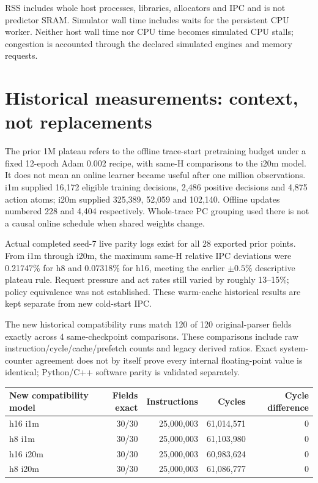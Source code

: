 \documentclass[10pt]{article}
\begin{document}
RSS includes whole host processes, libraries, allocators and IPC and is not predictor SRAM. Simulator wall time includes waits for the persistent CPU worker. Neither host wall time nor CPU time becomes simulated CPU stalls; congestion is accounted through the declared simulated engines and memory requests.

\clearpage\section{Historical measurements: context, not replacements}

The prior 1M plateau refers to the offline trace-start pretraining budget under a fixed 12-epoch Adam 0.002 recipe, with same-H comparisons to the i20m model. It does not mean an online learner became useful after one million observations. i1m supplied 16,172 eligible training decisions, 2,486 positive decisions and 4,875 action atoms; i20m supplied 325,389, 52,059 and 102,140. Offline updates numbered 228 and 4,404 respectively. Whole-trace PC grouping used there is not a causal online schedule when shared weights change.

Actual completed seed-7 live parity logs exist for all 28 exported prior points. From i1m through i20m, the maximum same-H relative IPC deviations were 0.21747\% for h8 and 0.07318\% for h16, meeting the earlier $\pm0.5\%$ descriptive plateau rule. Request pressure and act rates still varied by roughly 13--15\%; policy equivalence was not established. These warm-cache historical results are kept separate from new cold-start IPC.

The new historical compatibility runs match 120 of 120 original-parser fields exactly across 4 same-checkpoint comparisons. These comparisons include raw instruction/cycle/cache/prefetch counts and legacy derived ratios. Exact system-counter agreement does not by itself prove every internal floating-point value is identical; Python/C++ software parity is validated separately.

\begin{center}
\scriptsize
\begin{tabular}{lrrrr}
\toprule
New compatibility model & Fields exact & Instructions & Cycles & Cycle difference \\
\midrule
h16 i1m & 30/30 & 25,000,003 & 61,014,571 & 0 \\
h8 i1m & 30/30 & 25,000,003 & 61,103,980 & 0 \\
h16 i20m & 30/30 & 25,000,003 & 60,983,624 & 0 \\
h8 i20m & 30/30 & 25,000,003 & 61,086,777 & 0 \\
\bottomrule
\end{tabular}
\end{center}
\end{document}
